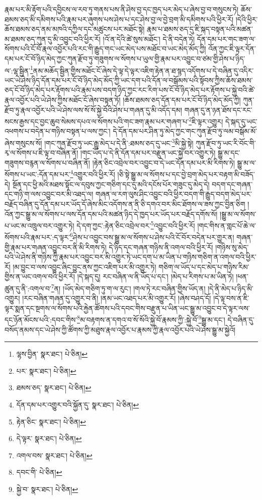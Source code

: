 རྣམ་པར་མི་རྟོག་པའི་དབྱིངས་ལ་རབ་ཏུ་གནས་པས་ནི་ཤེས་བྱ་དང་ཁྱད་པར་མེད་པ་ཞེས་བྱ་བ་གསུངས་ཏེ། ཆོས་ཐམས་ཅད་མི་དམིགས་པའི་རྣམ་པར་ཞུགས་པས་ཤེས་པ་དང་ཤེས་བྱ་ལ་བྱེ་བྲག་མི་དམིགས་པའི་ཕྱིར་རོ། །དེའི་ཕྱིར་ཆོས་ཐམས་ཅད་ནམ་མཁའི་དཀྱིལ་དང་མཚུངས་པར་མཐོང་སྟེ། རྣམ་པ་ཐམས་ཅད་དུ་ཇི་སྐད་བསྟན་པའི་མཚན་མ་ཐམས་ཅད་ཀུན་དུ་མི་འབྱུང་བའི་ཕྱིར་རོ། །འོ་ན་དེའི་ཚེ་སུས་མཐོང་། དེ་ནི་བདེན་ཏེ། དོན་དམ་པར་གང་ཟག་ལ་སོགས་པའི་ངོ་བོ་རྣལ་འབྱོར་པའི་རང་གི་རྒྱུད་གང་ཡང་མེད་པས་མཐོང་བ་ཡང་མེད་མོད་ཀྱི། འོན་ཀྱང་ཇི་ལྟར་དོན་དམ་པར་ངོ་བོ་ཉིད་མེད་ཀྱང་ཀུན་རྫོབ་ཏུ་གཟུགས་ལ་སོགས་པ་ཡུལ་གྱི་རྣམ་པར་འབྱུང་བ་ཙམ་གྱི་ཤེས་པ་ཉིད་ལ་:ལྷ་སྦྱིན་\footnote{ལྷས་བྱིན་  སྣར་ཐང་།  པེ་ཅིན། }ནམ་མཆོད་སྦྱིན་གྱིས་མཐོང་ངོ་ཞེས་དེ་ལྟ་དེ་ལྟར་འཇིག་རྟེན་ན་ཐ་སྙད་འདོགས་པ་དེ་བཞིན་དུ་འདིར་ཡང་ཡེ་ཤེས་ཉིད་དོན་དམ་པར་ངོ་བོ་ཉིད་མེད་མོད་ཀྱི་ཡང་དག་པའི་དོན་ལ་བསྒོམས་པའི་སྟོབས་ཀྱིས་ཆོས་ཐམས་ཅད་ངོ་བོ་ཉིད་མེད་པར་རྟོགས་པའི་རྣམ་པས་བདག་ཉིད་ཀྱང་རང་རིག་པས་ངོ་བོ་ཉིད་མེད་པར་རྟོགས་པ་སྐྱེ་བའི་ཚེ་རྣལ་འབྱོར་པའི་ཡེ་ཤེས་ཀྱིས་མཐོང་ངོ་ཞེས་བསྟན་ཏོ། །ཆོས་ཐམས་ཅད་དོན་དམ་པར་ངོ་བོ་ཉིད་མེད་མོད་ཀྱི། ཀུན་རྫོབ་ཏུ་རྣལ་འབྱོར་པའི་ཡེ་ཤེས་ལས་སོ་སོ་སྐྱེ་བོའི་ཤེས་པ་གཞན་དུ་མི་འདོད་དམ། གཞན་དུ་ན་ཉན་ཐོས་དང་རང་སངས་རྒྱས་དང་བྱང་ཆུབ་སེམས་དཔའ་ལ་སོགས་པའི་གང་ཟག་རྣམ་པར་གཞག་པ་\footnote{པར་  སྣར་ཐང་།  པེ་ཅིན། }ཇི་ལྟར་འགྱུར། དེ་སྐད་དུ་ཡང་འཕགས་པ་བདེན་པ་གཉིས་བསྟན་པ་ལས་ཀྱང་། དེ་དོན་དམ་པར་ཤིན་ཏུ་མེད་ཀྱང་གང་ཀུན་རྫོབ་ཏུ་ལམ་བསྒོམ་མོ་ཞེས་གསུངས་སོ། །གང་ཀུན་རྫོབ་ཏུ་ཡང་རྒྱུ་མེད་པ་དེ་ནི་:ཐམས་ཅད་དུ་ཡང་\footnote{ཐམས་ཅད་  སྣར་ཐང་།  པེ་ཅིན། }མི་སྐྱེ་སྟེ། ཀུན་རྫོབ་ཏུ་ཡང་རི་བོང་གི་རྭ་ལ་སོགས་པ་ཇི་ལྟ་བ་བཞིན་ནོ། །གང་ཡོད་པ་དེ་ནི་དོན་དམ་པར་བརྫུན་ཡང་སྐྱེ་བར་འགྱུར་ཏེ། སྒྱུ་མ་དང་གཟུགས་བརྙན་ལ་སོགས་པ་བཞིན་ནོ། །རྟེན་ཅིང་འབྲེལ་བར་འབྱུང་བ་དེ་ཡང་དོན་དམ་པར་མི་རིགས་ཏེ། སྒྱུ་མ་ལ་སོགས་པ་ཡང་:དོན་དམ་པར་\footnote{དོན་དམ་པར་འགྱུར་བའི་སྐྱོན་དུ་  སྣར་ཐང་།  པེ་ཅིན། }འགྱུར་བའི་ཕྱིར་རོ། །ཅི་སྟེ་སྒྱུ་མ་ལ་སོགས་པ་དང་བྱེ་བྲག་མེད་པར་བརྟག་མི་བཟོད་དེ། སྔོན་དང་ཕྱི་མའི་མཐས་སྟོང་ལ་དབུས་ཀྱང་གཅིག་དང་དུ་མའི་དངོས་པོར་གཟུང་དུ་མེད་དེ། བདག་དང་གཞན་དང་གཉི་ག་ལས་འབྱུང་བར་མི་འཐད་ལ། གཞན་ལ་རག་ལུས་ཤིང་འབྱུང་བའི་ཕྱིར་བདག་གི་རྒྱུད་བདག་མེད་པར་བརྗོད་བཞིན་དུ་དོན་དམ་པར་ཡོད་དོ་ཞེས་མིང་འདོགས་ན་ནི་ཅི་དགའ་བར་མིང་ཐོགས་ལ་ཟས་ཀྱང་བྱིན་ཅིག །འོན་ཀྱང་སྒྱུ་མ་ལ་སོགས་པ་ལས་དོན་དམ་པའི་མཚན་ཉིད་དེ་ཁྱད་པར་ཡོད་པར་བརྗོད་དགོས་སོ། །སྒྱུ་མ་ལ་སོགས་པ་ཡང་མ་འཁྲུལ་བར་འགྱུར་ཏེ། དེ་དག་ཀྱང་:རྟེན་ཅིང་འབྲེལ་བར་\footnote{རྟེན་ཅིང་  སྣར་ཐང་།  པེ་ཅིན། }འབྱུང་བའི་ཕྱིར་རོ། །གང་གིས་ན་གླང་པོ་ཆེ་ལ་སོགས་པའི་རྣམ་པར་:ད་ལྟར་\footnote{དེ་ལྟར་  སྣར་ཐང་།  པེ་ཅིན། }ཤེས་པ་འབྱུང་བས་སྒྱུ་མ་ལ་སོགས་པ་ཤེས་པའི་ངོ་བོར་བདེན་པར་གྱུར་ན། གཞན་གྱི་རྣམ་པར་གཞན་འབྱུང་བར་ནི་མི་རིགས་ཏེ། དེ་ཉིད་དང་གཞན་གཉིས་ནི་འགལ་བའི་ཕྱིར་རོ། །གཉིས་སུ་མེད་པའི་ཡེ་ཤེས་ནི་གཉིས་ཀྱི་རྣམ་པར་འབྱུང་བར་མི་འགྱུར་ཏེ་ཡང་དག་པ་མ་ཡིན་པ་གཉིས་གཅིག་ན་འགལ་བའི་ཕྱིར་རོ། །མ་བྱུང་བ་ལས་འབྱུང་ཞིང་བྱུང་ནས་ཀྱང་འཇིག་པར་མི་འགྱུར་ཏེ། གཅིག་ལ་ཡོད་པ་དང་མེད་པ་གཉིས་རིམ་གྱིས་ན་ཡང་འགལ་བའི་ཕྱིར་རོ། །དེ་སྐད་དུ། རང་བཞིན་ལ་ནི་ཡོད་པ་དང་། །མེད་པ་རིགས་པ་མ་ཡིན་ཏེ། །ཕན་ཚུན་དུ་ནི་:འགལ་བ་\footnote{འགལ་བས་  སྣར་ཐང་།  པེ་ཅིན། }ན། །ཡོད་མེད་གཅིག་ཏུ་ག་ལ་རུང་། །གལ་ཏེ་རང་བཞིན་གྱིས་ཡོད་ན། །དེ་ནི་མེད་པ་ཉིད་མི་འགྱུར། །རང་བཞིན་གཞན་དུ་འགྱུར་བ་ནི། །ནམ་ཡང་འཐད་པར་མི་འགྱུར་རོ། །ཞེས་བཤད་དོ། །དེ་ལྟ་བས་ན་ཇི་ལྟར་སྨན་དང་སྔགས་ལ་སོགས་པའི་རྐྱེན་ཚོགས་པའི་དབང་གིས་བརྫུན་པ་ཡིན་ཡང་སྒྱུ་མ་འབྱུང་བ་དེ་ལྟར་ལས་དང་ཉོན་མོངས་པའི་:དབང་གིས་\footnote{དབང་གི་  པེ་ཅིན། }མ་བརྟགས་ན་དགའ་བ་སོ་སོའི་སྐྱེ་བོ་རྣམས་ཀྱི་:སྐྱེ་བོ་\footnote{སྐྱེ་བ་  སྣར་ཐང་།  པེ་ཅིན། }སྒྱུ་མ་དང་། དེ་བཞིན་དུ་བསོད་ནམས་དང་ཡེ་ཤེས་ཀྱི་ཚོགས་ཀྱི་མཐུས་རྣལ་འབྱོར་པ་རྣམས་ཀྱི་རྣལ་འབྱོར་པའི་ཡེ་ཤེས་སྒྱུ་མ་སྐྱེའོ། 